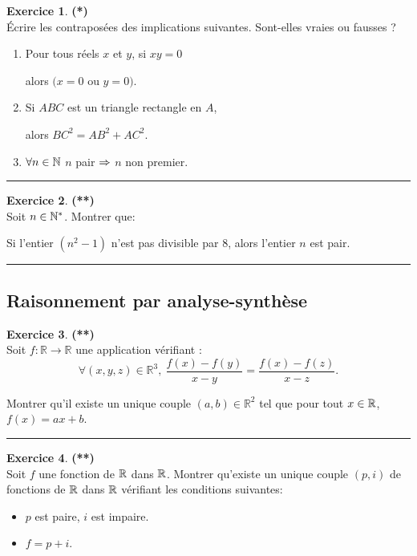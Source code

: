 \documentclass[a4paper,11pt]{article}
\theoremstyle{definition}
\newtheorem{exo}{Exercice} %
\begin{document}
\begin{minipage}{1\linewidth}
	\begin{minipage}[t]{0.48\linewidth}
		\raggedright
		
\begin{exo}\textbf{(*)}\quad\\[0.2cm]
	Écrire les contraposées des implications suivantes. Sont-elles vraies ou
	fausses ?
	\begin{enumerate}
		\item Pour tous réels $x$ et $y$, si $xy = 0$
		
		alors $(x = 0$ ou $y = 0)$.
		\item Si $ABC$ est un triangle rectangle en $A$, 
		
		alors $BC^2 = AB^2 + AC^2$.
		\item $\forall n \in \mathbb{N}$ $n$ pair $ \Large\Rightarrow$ $n$ non premier.
	\end{enumerate}
	
	\centering
	\rule{1\linewidth}{0.6pt}
\end{exo}

		

\begin{exo}\textbf{(**)}\quad\\[0.2cm]
	Soit $n\in\mathbb{N}^*$. Montrer que:
	
 Si l'entier $(n^2-1)$ n'est pas divisible par $8$, alors l'entier $n$ est pair. 
	
	\centering
	\rule{1\linewidth}{0.6pt}
\end{exo}

	\subsection*{Raisonnement par analyse-synthèse}
		
		
		
		\begin{exo}\textbf{(**)}\quad\\[0.2cm]
			Soit $f : \mathbb{R} \longrightarrow \mathbb{R}$ une application vérifiant :
			$$ \forall (x,y,z) \in \mathbb{R}^{3},\  \dfrac{f(x)-f(y)}{x-y} = \dfrac{f(x)-f(z)}{x-z}.$$
			
			\noindent Montrer qu'il existe un unique couple $(a,b) \in \mathbb{R}^{2}$ tel que pour tout $x\in\mathbb{R}$, \ $f(x) = ax+b$.
			
			
			\centering
			\rule{1\linewidth}{0.6pt}
		\end{exo}
		
		\begin{exo} \textbf{(**)}\quad\\[0.2cm]
			Soit $f$ une fonction de $\mathbb{R}$ dans $\mathbb{R}$. Montrer qu'existe un unique couple $(p, i)$ de fonctions de $\mathbb{R}$ dans $\mathbb{R}$ vérifiant les conditions suivantes:
			\begin{itemize}
				\item $p$ est paire, $i$ est impaire.
				\item $f = p + i$.
			\end{itemize}
			

\end{exo}
\end{minipage}
\end{minipage}
\end{document}
